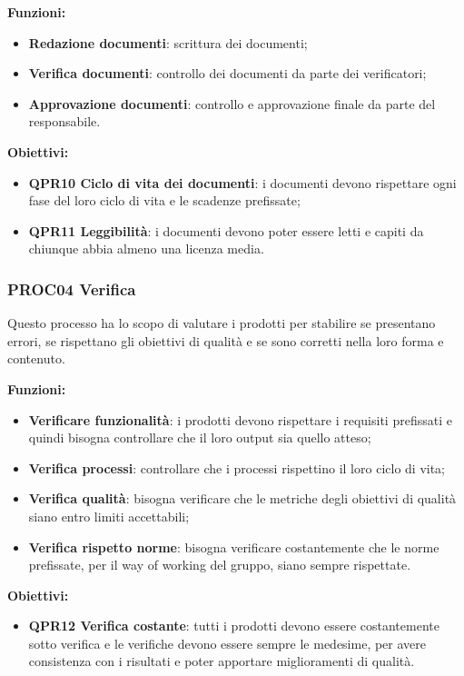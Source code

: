 \documentclass[../piano_di_qualifica.tex]{subfiles}
\begin{document}
\textbf{Funzioni:}
\smallbreak
\begin{itemize}
	\item \textbf{Redazione documenti}: scrittura dei documenti;
	\item \textbf{Verifica documenti}: controllo dei documenti da parte dei verificatori;
	\item \textbf{Approvazione documenti}: controllo e approvazione finale da parte del responsabile.
\end{itemize}

\textbf{Obiettivi:}
\smallbreak
\begin{itemize}
	\item \textbf{QPR10 Ciclo di vita dei documenti}: i documenti devono rispettare ogni fase del loro ciclo di vita e le scadenze prefissate;
	\item \textbf{QPR11 Leggibilità}: i documenti devono poter essere letti e capiti da chiunque abbia almeno una licenza media.
\end{itemize}

\subsubsection{PROC04 Verifica}
Questo processo ha lo scopo di valutare i prodotti per stabilire se presentano errori, se rispettano gli obiettivi di qualità e se sono corretti nella loro forma e contenuto.

\textbf{Funzioni:}
\smallbreak
\begin{itemize}
	\item \textbf{Verificare funzionalità}:  i prodotti devono rispettare i requisiti prefissati e quindi bisogna controllare che il loro output sia quello atteso;
	\item \textbf{Verifica processi}:  controllare che i processi rispettino il loro ciclo di vita;
	\item \textbf{Verifica qualità}:  bisogna verificare che le metriche degli obiettivi di qualità siano entro limiti accettabili;
	\item \textbf{Verifica rispetto norme}: bisogna verificare costantemente che le norme prefissate, per il way of working del gruppo, siano sempre rispettate.
\end{itemize}

\textbf{Obiettivi:}
\smallbreak
\begin{itemize}
	\item \textbf{QPR12 Verifica costante}: tutti i prodotti devono essere costantemente sotto verifica e le verifiche devono essere sempre le medesime, per avere consistenza con i risultati e poter apportare miglioramenti di qualità.
\end{itemize}
\end{document}
